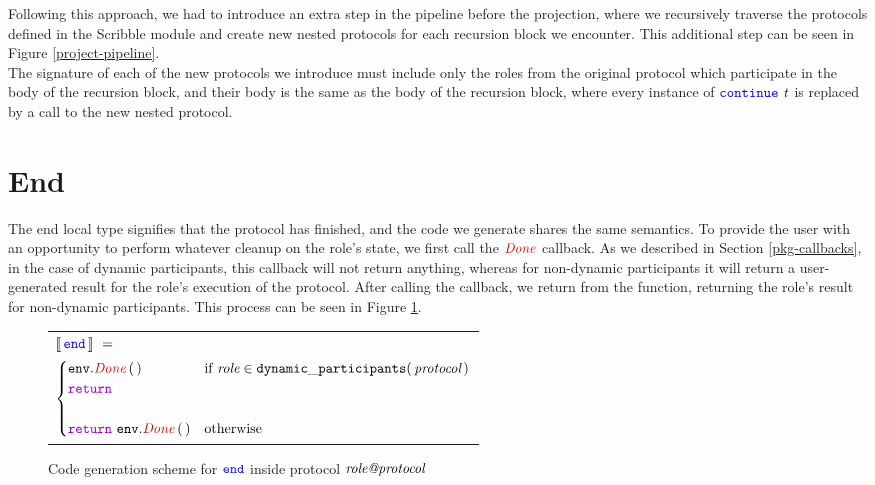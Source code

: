 \documentclass[12pt,twoside]{report}
\begin{document}
Following this approach, we had to introduce an extra step in the pipeline before the projection, where we recursively traverse the protocols defined in the Scribble module and create new nested protocols for each recursion block we encounter. This additional step can be seen in Figure \ref{project-pipeline}.\\

The signature of each of the new protocols we introduce must include only the roles from the original protocol which participate in the body of the recursion block, and their body is the same as the body of the recursion block, where every instance of ${\color{blue}\mathtt{continue}}\ \mathit{t}$ is replaced by a call to the new nested protocol.


\section{End}
The end local type signifies that the protocol has finished, and the code we generate shares the same semantics. To provide the user with an opportunity to perform whatever cleanup on the role's state, we first call the $\functionname{Done}$ callback. As we described in Section \ref{pkg-callbacks}, in the case of dynamic participants, this callback will not return anything, whereas for non-dynamic participants it will return a user-generated result for the role's execution of the protocol. After calling the callback, we return from the function, returning the role's result for non-dynamic participants. This process can be seen in Figure \ref{end-codegen}.

\begin{figure}[!h]
    \begin{center}
        \begin{tabular}{l}
            $\llbracket\,{\color{blue}\mathtt{end}}\,\rrbracket\ =\ $\\[3pt]
            \quad 
            \begin{math}
                \begin{cases}
                    \methodcall{\envparam}{Done}\,\emptyparams  & \text{if}\ \textit{role} \in \mathtt{dynamic\_participants}(\,\textit{protocol}\,)\\
                    \goreturn  & \\\\
                    \goreturn\ \methodcall{\envparam}{Done}\,\emptyparams & \text{otherwise}
                \end{cases}
            \end{math}
            
            
        \end{tabular}
    \end{center}
    \caption{Code generation scheme for ${\color{blue}\mathtt{end}}$ inside protocol $\textit{{role@protocol}}$}
    \label{end-codegen}
\end{figure}
\end{document}
